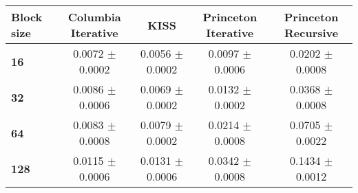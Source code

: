 \begin{tabular}{lcccc}\toprule
\textbf{Block size}  & \textbf{Columbia Iterative} & \textbf{KISS} & \textbf{Princeton Iterative} & \textbf{Princeton Recursive}\\\midrule
\textbf{16}  & 0.0072 $\pm$ 0.0002 & 0.0056 $\pm$ 0.0002 & 0.0097 $\pm$ 0.0006 & 0.0202 $\pm$ 0.0008\\
\textbf{32}  & 0.0086 $\pm$ 0.0006 & 0.0069 $\pm$ 0.0002 & 0.0132 $\pm$ 0.0002 & 0.0368 $\pm$ 0.0008\\
\textbf{64}  & 0.0083 $\pm$ 0.0008 & 0.0079 $\pm$ 0.0002 & 0.0214 $\pm$ 0.0008 & 0.0705 $\pm$ 0.0022\\
\textbf{128} & 0.0115 $\pm$ 0.0006 & 0.0131 $\pm$ 0.0006 & 0.0342 $\pm$ 0.0008 & 0.1434 $\pm$ 0.0012\\
\bottomrule
\end{tabular}
